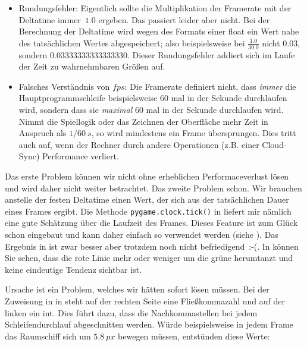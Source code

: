 \begin{itemize}
    \item Rundungsfehler: Eigentlich sollte die Multiplikation der Framerate mit der Deltatime immer~$1.0$ ergeben. Das passiert leider aber nicht. Bei der Berechnung der Deltatime wird wegen des Formats einer \gls{float} ein Wert nahe des tatsächlichen Wertes abgespeichert; also beispielsweise bei $\frac{1.0}{30.0}$ nicht $0.0\overline{3}$, sondern $0.03333333333333330$. Dieser Rundungsfehler addiert sich im Laufe der Zeit zu wahrnehmbaren Größen auf.

    \item Falsches Verständnis von $fps$: Die Framerate definiert nicht, dass \emph{immer} die Hauptprogrammschleife beispielsweise 60 mal in der Sekunde durchlaufen wird, sondern dass sie \emph{maximal} 60 mal in der Sekunde durchlaufen wird. Nimmt die Spiellogik oder das Zeichnen der Oberfläche mehr Zeit in Anspruch als $1/60~s$, so wird mindestens ein Frame übersprungen. Dies tritt auch auf, wenn der Rechner durch andere Operationen (z.B. einer Cloud-Sync) Performance verliert. 
\end{itemize}

Das erste Problem können wir nicht ohne erheblichen Performaceverlust lösen und wird daher nicht weiter betrachtet. Das zweite Problem schon. Wir brauchen anstelle der festen Deltatime einen Wert, der sich aus der tatsächlichen Dauer eines Frames ergibt. Die Methode \texttt{pygame.clock.tick()} in  liefert mir nämlich eine gute Schätzung über die Laufzeit des Frames. Dieses Feature ist zum Glück schon eingebaut und kann daher einfach so verwendet werden (siehe ). Das Ergebnis in  ist zwar besser aber trotzdem noch nicht befriedigend~{:-(}. In  können Sie sehen, dass die rote Linie mehr oder weniger um die grüne herumtanzt und keine eindeutige Tendenz sichtbar ist.


\newpage
{}

Ursache ist ein Problem, welches wir hätten sofort lösen müssen. Bei der Zuweisung in  in  steht auf der rechten Seite eine Fließkommazahl und auf der linken ein \gls{int}. Dies führt dazu, dass die Nachkommastellen bei jedem Schleifendurchlauf abgeschnitten werden. Würde beispielsweise in jedem Frame das Raumschiff sich um $5.8~px$ bewegen müssen, entstünden diese Werte:

